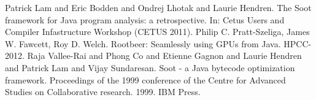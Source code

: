 \documentclass[preprint]{sigplanconf}
\begin{document}




\begin{thebibliography}{}
\softraggedright

 Patrick Lam and Eric Bodden and Ondrej Lhotak and Laurie Hendren. The Soot framework for Java program analysis: a retrospective. In: Cetus Users and Compiler Infastructure Workshop (CETUS 2011).
 Philip C. Pratt-Szeliga, James W. Fawcett, Roy D. Welch. Rootbeer: Seamlessly using GPUs from Java. HPCC-2012.
 Raja Vallee-Rai and Phong Co and Etienne Gagnon and Laurie Hendren and Patrick Lam and Vijay Sundaresan. Soot - a Java bytecode optimization framework. Proceedings of the 1999 conference of the Centre for Advanced Studies on Collaborative research. 1999. IBM Press.

\end{thebibliography}
\end{document}
